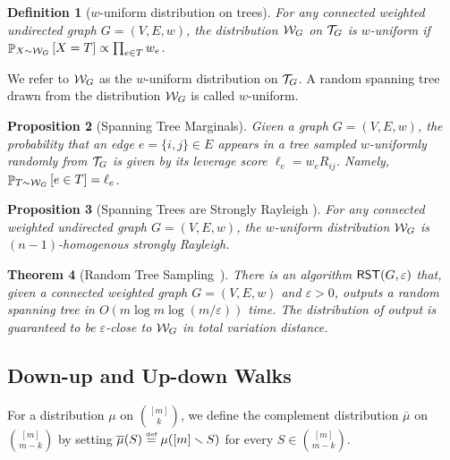 \documentclass[11pt]{article}
\newtheorem{theorem}{Theorem} \newtheorem{lemma}[theorem]{Lemma} \newtheorem{proposition}[theorem]{Proposition} \newtheorem{corollary}[theorem]{Corollary} \newtheorem{definition}[theorem]{Definition} \newtheorem{conjecture}[theorem]{Conjecture} \newtheorem{claim}[theorem]{Claim} \newtheorem{fact}[theorem]{Fact}
\newcommand{\parens}[1]{( #1 )}
\newcommand{\sqb}[1]{\left[ #1 \right]}
\newcommand{\sets}[1]{\{ #1 \}}
\newcommand{\defeq}{\stackrel{\smash{\text{\tiny\rm def}}}{=}}
\begin{document}
{\begin{definition}[$w$-uniform distribution on trees]
For any connected weighted undirected graph $G =\parens{V,E,w}$, the distribution $\mathcal{W}_G$ on $\mathcal{T}_G$ is $w$-uniform if $\pb_{X\sim \cW_G}\sqb{ X=T}\propto \prod _{e \in T} w _e$.
\end{definition}
We refer to $\mathcal{W}_G$ as the $w$-uniform distribution on $\mathcal{T}_G$.
A random spanning tree drawn from the distribution $\mathcal{W}_G$ is called $w$-uniform.

\begin{proposition}[Spanning Tree Marginals]\label{lemma:Spanning-Tree-Marginals}
  Given a graph $G=\parens{V,E,w}$, the probability that an edge $e=\sets{i,j} \in E $
  appears in a tree sampled $w$-uniformly randomly from $\mathcal{T}_G $ is given by its
  leverage score $\ell_e = w_e R_{ij}$.
  Namely, $\pb_{ T \sim \cW_{G } }\sqb{e\in T}=\ell_e$.
\end{proposition}

\begin{proposition}[Spanning Trees are Strongly Rayleigh {\cite[Theorem 3.6]{borcea2009negative}}]
	For any connected weighted undirected graph $G =\parens{V,E,w}$, the $w$-uniform distribution $\mathcal{W}_G$ is $\parens{n-1}$-homogenous strongly Rayleigh.
\end{proposition}

\begin{theorem}[Random Tree Sampling~{\cite[Theorem 2]{anari2021log}}]\label{thm:classical-random-tree-sampling}
	There is an algorithm $\RST\parens{G,\varepsilon}$ that, given a connected weighted graph $G=\parens{V,E,w}$ and $\varepsilon>0$, outputs a random spanning tree in $O\parens{m\log m\log\parens{m/\varepsilon}}$ time. The distribution of output is guaranteed to be $\varepsilon$-close to $\mathcal{W}_G$ in total variation distance.
\end{theorem}



\subsection{Down-up and Up-down Walks}
For a distribution $\mu$ on $\binom{\sqb{m}}{k}$, 
we define the  complement
distribution $\bar\mu$ on $\binom{\sqb{m}}{m -k}$ by setting 
$\bar \mu \parens{S}\defeq\mu\parens{\sqb{m}\smallsetminus S}$ for every $S \in \binom{\sqb{m}}{m -k}$.


}
\end{document}
